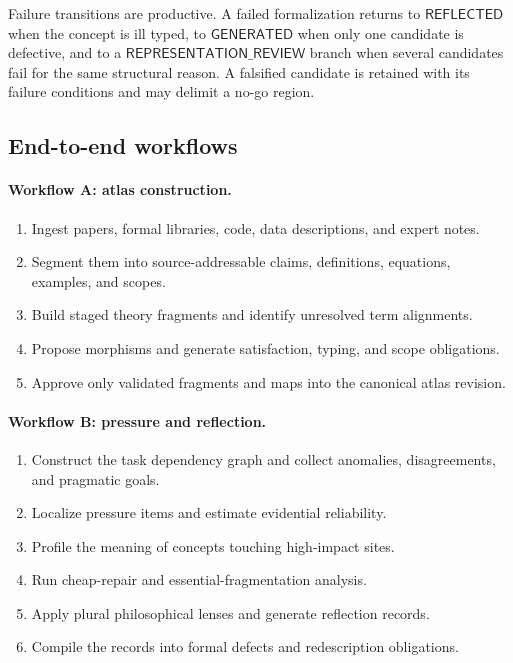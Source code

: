 \documentclass[11pt]{article}
\begin{document}
Failure transitions are productive. A failed formalization returns to \(\mathsf{REFLECTED}\) when the
concept is ill typed, to \(\mathsf{GENERATED}\) when only one candidate is defective, and to a
\(\mathsf{REPRESENTATION\_REVIEW}\) branch when several candidates fail for the same structural
reason. A falsified candidate is retained with its failure conditions and may delimit a no-go region.

\subsection{End-to-end workflows}

\paragraph{Workflow A: atlas construction.}
\begin{enumerate}
  \item Ingest papers, formal libraries, code, data descriptions, and expert notes.
  \item Segment them into source-addressable claims, definitions, equations, examples, and scopes.
  \item Build staged theory fragments and identify unresolved term alignments.
  \item Propose morphisms and generate satisfaction, typing, and scope obligations.
  \item Approve only validated fragments and maps into the canonical atlas revision.
\end{enumerate}

\paragraph{Workflow B: pressure and reflection.}
\begin{enumerate}
  \item Construct the task dependency graph and collect anomalies, disagreements, and pragmatic goals.
  \item Localize pressure items and estimate evidential reliability.
  \item Profile the meaning of concepts touching high-impact sites.
  \item Run cheap-repair and essential-fragmentation analysis.
  \item Apply plural philosophical lenses and generate reflection records.
  \item Compile the records into formal defects and redescription obligations.
\end{enumerate}
\end{document}
